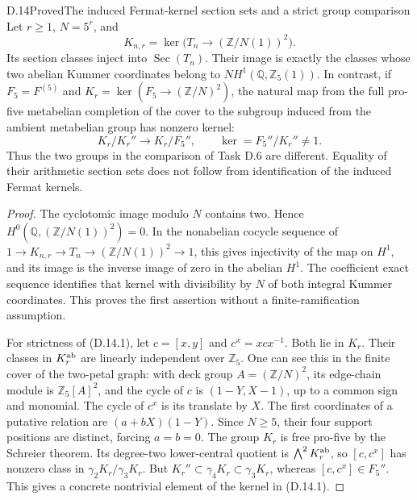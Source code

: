 \begin{statement}{D.14}{Proved}{The induced Fermat-kernel section sets and a strict group comparison}
Let \(r\ge1\), \(N=5^r\), and
\[
 K_{n,r}=\ker\bigl(T_n\longrightarrow(\mathbb Z/N(1))^2\bigr).
\]
Its section classes inject into \(\operatorname{Sec}(T_n)\).
Their image is exactly the classes whose two abelian
Kummer coordinates belong to
\(N H^1(\mathbb Q,\mathbb Z_5(1))\).
In contrast, if \(F_5=F^{(5)}\) and
\(K_r=\ker(F_5\to(\mathbb Z/N)^2)\), the natural map
from the full pro-five metabelian completion of the
cover to the subgroup induced from the ambient
metabelian group has nonzero kernel:
\[
 K_r/K_r''\longrightarrow K_r/F_5'',\qquad
 \ker=F_5''/K_r''\ne1.                                 \tag{D.14.1}
\]
Thus the two groups in the comparison of Task D.6 are
different. Equality of their arithmetic section sets
does not follow from identification of the induced
Fermat kernels.
\end{statement}
\begin{proof}
The cyclotomic image modulo \(N\) contains two. Hence
\(H^0(\mathbb Q,(\mathbb Z/N(1))^2)=0\).
In the nonabelian cocycle sequence of
\(1\to K_{n,r}\to T_n\to(\mathbb Z/N(1))^2\to1\),
this gives injectivity of the map on \(H^1\), and its
image is the inverse image of zero in the abelian
\(H^1\). The coefficient exact sequence identifies
that kernel with divisibility by \(N\) of both
integral Kummer coordinates. This proves the first
assertion without a finite-ramification assumption.

For strictness of (D.14.1), let \(c=[x,y]\) and
\(c^x=xcx^{-1}\). Both lie in \(K_r\). Their classes
in \(K_r^{\rm ab}\) are linearly independent over
\(\mathbb Z_5\). One can see this in the finite cover
of the two-petal graph: with deck group
\(A=(\mathbb Z/N)^2\), its edge-chain module is
\(\mathbb Z_5[A]^2\), and the cycle of \(c\) is
\((1-Y,X-1)\), up to a common sign and monomial.
The cycle of \(c^x\) is its translate by \(X\).
The first coordinates of a putative relation are
\((a+bX)(1-Y)\). Since \(N\ge5\), their four support
positions are distinct, forcing \(a=b=0\).
The group \(K_r\) is free pro-five by the Schreier
theorem. Its degree-two lower-central quotient is
\(\bigwedge^2K_r^{\rm ab}\), so
\([c,c^x]\) has nonzero class in
\(\gamma_2K_r/\gamma_3K_r\). But
\(K_r''\subset\gamma_4K_r\subset\gamma_3K_r\),
whereas \([c,c^x]\in F_5''\). This gives a concrete
nontrivial element of the kernel in (D.14.1).
\end{proof}

